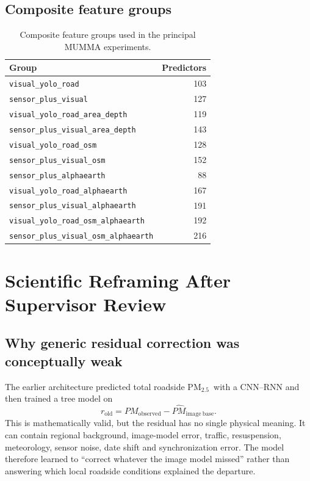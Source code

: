 \documentclass[11pt,a4paper,oneside]{report}
\newcommand{\pmtwo}{PM$_{2.5}$}
\begin{document}
\section{Composite feature groups}
\begin{table}[H]
  \centering
  \caption{Composite feature groups used in the principal MUMMA experiments.}
  \label{tab:composites}
  \begin{tabular}{l r}
    \toprule
    Group & Predictors\\
    \midrule
    \texttt{visual\_yolo\_road} & 103\\
    \texttt{sensor\_plus\_visual} & 127\\
    \texttt{visual\_yolo\_road\_area\_depth} & 119\\
    \texttt{sensor\_plus\_visual\_area\_depth} & 143\\
    \texttt{visual\_yolo\_road\_osm} & 128\\
    \texttt{sensor\_plus\_visual\_osm} & 152\\
    \texttt{sensor\_plus\_alphaearth} & 88\\
    \texttt{visual\_yolo\_road\_alphaearth} & 167\\
    \texttt{sensor\_plus\_visual\_alphaearth} & 191\\
    \texttt{visual\_yolo\_road\_osm\_alphaearth} & 192\\
    \texttt{sensor\_plus\_visual\_osm\_alphaearth} & 216\\
    \bottomrule
  \end{tabular}
\end{table}

\chapter{Scientific Reframing After Supervisor Review}

\section{Why generic residual correction was conceptually weak}
The earlier architecture predicted total roadside \pmtwo\ with a CNN--RNN and
then trained a tree model on
\begin{equation}
  r_{\mathrm{old}} =
  PM_{\mathrm{observed}}-\widehat{PM}_{\mathrm{image\ base}}.
\end{equation}
This is mathematically valid, but the residual has no single physical meaning.
It can contain regional background, image-model error, traffic, resuspension,
meteorology, sensor noise, date shift and synchronization error. The model
therefore learned to ``correct whatever the image model missed'' rather than
answering which local roadside conditions explained the departure.
\end{document}
